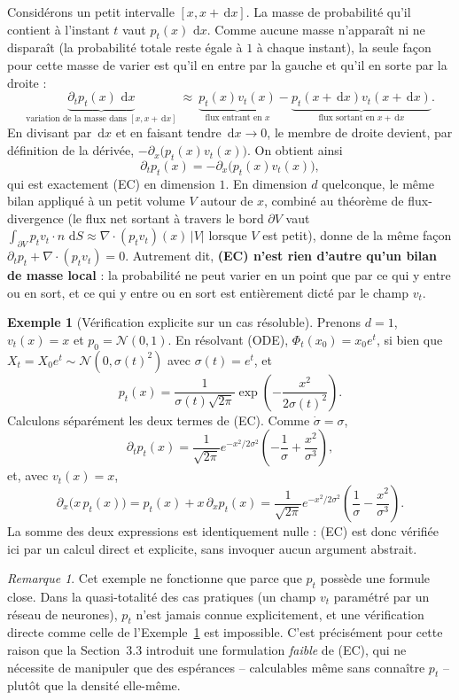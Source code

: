 \documentclass[11pt,a4paper]{article}
\theoremstyle{definition}
\newtheorem{example}{Exemple}[section]
\theoremstyle{plain}
\theoremstyle{remark}
\newtheorem{remark}{Remarque}[section]
\newcommand{\dd}{\,\mathrm{d}}
\begin{document}
Considérons un petit intervalle $[x,x+\dd x]$. La masse de probabilité qu'il
contient à l'instant $t$ vaut $p_t(x)\,\dd x$. Comme aucune masse n'apparaît ni
ne disparaît (la probabilité totale reste égale à $1$ à chaque instant), la
seule façon pour cette masse de varier est qu'il en entre par la gauche et
qu'il en sorte par la droite :
\[
  \underbrace{\partial_t p_t(x)\,\dd x}_{\text{variation de la masse dans }[x,x+\dd x]}
  \ \approx\
  \underbrace{p_t(x)v_t(x)}_{\text{flux entrant en }x}
  -
  \underbrace{p_t(x+\dd x)v_t(x+\dd x)}_{\text{flux sortant en }x+\dd x}.
\]
En divisant par $\dd x$ et en faisant tendre $\dd x\to 0$, le membre de droite
devient, par définition de la dérivée, $-\partial_x\bigl(p_t(x)v_t(x)\bigr)$.
On obtient ainsi
\[
  \partial_t p_t(x) = -\partial_x\bigl(p_t(x)v_t(x)\bigr),
\]
qui est exactement (EC) en dimension $1$. En dimension $d$ quelconque, le même
bilan appliqué à un petit volume $V$ autour de $x$, combiné au théorème de
flux-divergence (le flux net sortant à travers le bord $\partial V$ vaut
$\int_{\partial V}p_t v_t\cdot n\,\dd S \approx \nabla\cdot(p_tv_t)(x)\,|V|$
lorsque $V$ est petit), donne de la même façon $\partial_t p_t+\nabla\cdot(p_tv_t)=0$.
Autrement dit, \textbf{(EC) n'est rien d'autre qu'un bilan de masse local} :
la probabilité ne peut varier en un point que par ce qui y entre ou en sort,
et ce qui y entre ou en sort est entièrement dicté par le champ $v_t$.

\begin{example}[Vérification explicite sur un cas résoluble]\label{ex:ec-explicite}
Prenons $d=1$, $v_t(x)=x$ et $p_0=\mathcal{N}(0,1)$. En résolvant (ODE),
$\Phi_t(x_0)=x_0e^t$, si bien que $X_t=X_0e^t\sim\mathcal{N}(0,\sigma(t)^2)$ avec
$\sigma(t)=e^t$, et
\[
  p_t(x) = \frac{1}{\sigma(t)\sqrt{2\pi}}\exp\!\left(-\frac{x^2}{2\sigma(t)^2}\right).
\]
Calculons séparément les deux termes de (EC). Comme $\dot\sigma=\sigma$,
\[
  \partial_t p_t(x)
  =
  \frac{1}{\sqrt{2\pi}}e^{-x^2/2\sigma^2}\left(-\frac{1}{\sigma}+\frac{x^2}{\sigma^3}\right),
\]
et, avec $v_t(x)=x$,
\[
  \partial_x\bigl(x\,p_t(x)\bigr)
  =
  p_t(x)+x\,\partial_xp_t(x)
  =
  \frac{1}{\sqrt{2\pi}}e^{-x^2/2\sigma^2}\left(\frac{1}{\sigma}-\frac{x^2}{\sigma^3}\right).
\]
La somme des deux expressions est identiquement nulle : (EC) est donc vérifiée
ici par un calcul direct et explicite, sans invoquer aucun argument abstrait.
\end{example}

\begin{remark}
Cet exemple ne fonctionne que parce que $p_t$ possède une formule close. Dans
la quasi-totalité des cas pratiques (un champ $v_t$ paramétré par un réseau de
neurones), $p_t$ n'est jamais connue explicitement, et une vérification directe
comme celle de l'Exemple~\ref{ex:ec-explicite} est impossible. C'est précisément
pour cette raison que la Section~3.3 introduit une formulation \emph{faible} de
(EC), qui ne nécessite de manipuler que des espérances -- calculables même sans
connaître $p_t$ -- plutôt que la densité elle-même.
\end{remark}
\end{document}
